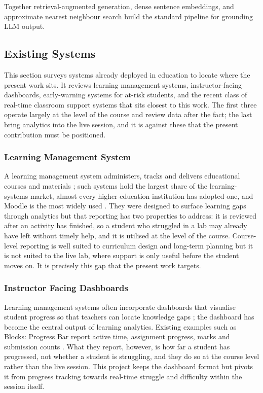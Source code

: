 Together retrieval-augmented generation, dense sentence embeddings, and approximate nearest neighbour search build the standard pipeline for grounding LLM output.

\subsection{Existing Systems}

This section surveys systems already deployed in education to locate where the present work sits. 
It reviews learning management systems, instructor-facing dashboards, early-warning systems for at-risk students, and the recent class of real-time classroom support systems that sits closest to this work. 
The first three operate largely at the level of the course and review data after the fact; the last bring analytics into the live session, and it is against these that the present contribution must be positioned.

\subsubsection{Learning Management System }
A learning management system administers, tracks and delivers educational courses and materials \cite{wikipediacontributors_2019_learning_management_systems}; such systems hold the largest share of the learning-systems market, almost every higher-education institution has adopted one, and Moodle is the most widely used \cite{wikipediacontributors_2019_learning_management_systems}. They were designed to surface learning gaps through analytics but that reporting has two properties to address: it is reviewed after an activity has finished, so a student who struggled in a lab may already have left without timely help, and it is utilised at the level of the course. Course-level reporting is well suited to curriculum design and long-term planning but it is not suited to the live lab, where support is only useful before the student moves on. It is precisely this gap that the present work targets.

\subsubsection{Instructor Facing Dashboards}

Learning management systems often incorporate dashboards that visualise student progress so that teachers can locate knowledge gaps \cite{kiatxin_development}; the dashboard has become the central output of learning analytics. Existing examples such as Blocks: Progress Bar report active time, assignment progress, marks and submission counts \cite{kiatxin_development,holsteinIntelligentTutorsTeachers2017a,holsteinStudentLearningBenefits2018}. What they report, however, is how far a student has progressed, not whether a student is struggling, and they do so at the course level rather than the live session. This project keeps the dashboard format but pivots it from progress tracking towards real-time struggle and difficulty within the session itself.


